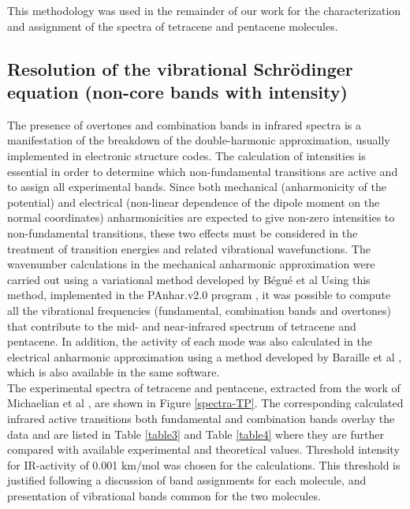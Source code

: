 This methodology was used in the remainder of our work for the characterization and assignment of the spectra of tetracene and pentacene molecules.

\subsection{Resolution of the vibrational Schrödinger equation (non-core bands with intensity)}

 The presence of overtones and combination bands in infrared spectra is a manifestation of the breakdown of the double-harmonic approximation, usually implemented in electronic structure codes. The calculation of intensities is essential in order to determine which non-fundamental transitions are active and to assign all experimental bands. Since both mechanical (anharmonicity of the potential) and electrical (non-linear dependence of the dipole moment on the normal coordinates) anharmonicities are expected to give non-zero intensities to non-fundamental transitions, these two effects must be considered in the treatment of transition energies and related vibrational wavefunctions. The wavenumber calculations in the mechanical anharmonic approximation were carried out using a variational method developed by Bégué et al \cite{begue2007comparison} Using this method, implemented in the P\textunderscore Anhar.v2.0 program \cite{gohaud2005new},  it was possible to compute all the vibrational frequencies (fundamental, combination bands and overtones) that contribute to the mid- and near-infrared spectrum of tetracene and pentacene. In addition, the activity of each mode was also calculated in the electrical anharmonic approximation using a method developed by Baraille et al \cite{begue2010calculation,baraille2001calculation} , which is also available in the same software.\\

The experimental spectra of tetracene and pentacene, extracted from the work of Michaelian et al \cite{michaelian2012far} , are shown in Figure \ref{spectra-TP}. The corresponding calculated infrared active transitions both fundamental and combination bands overlay the data and are listed in Table \ref{table3} and Table \ref{table4} where they are further compared with available experimental and theoretical values. Threshold intensity for IR-activity of 0.001 km/mol was chosen for the calculations. This threshold is justified following a discussion of band assignments for each molecule, and presentation of vibrational bands common for the two molecules.

